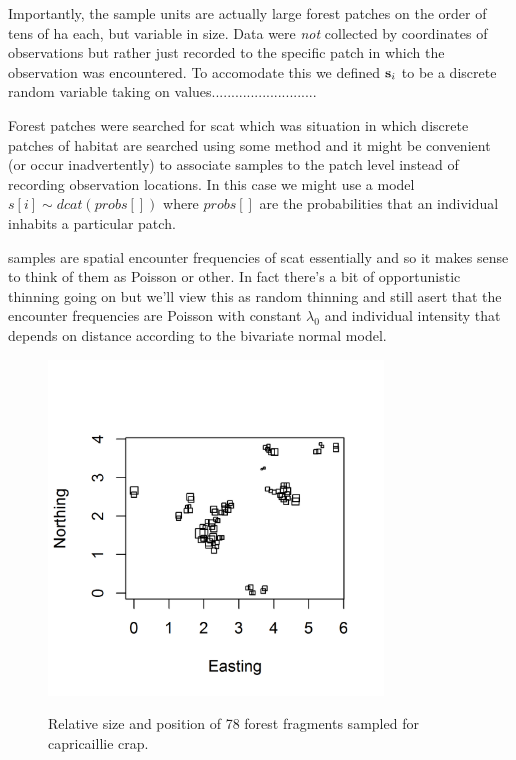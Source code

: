 {Importantly, the sample units are actually large forest
patches on the order of tens of ha each, but variable in size. Data
were {\it not} collected by coordinates of observations but rather
just recorded to the specific patch in which the observation was
encountered. To accomodate this we defined ${\bf s}_{i}$ to be a
discrete
random variable taking on values...........................

Forest patches were searched for scat which was
situation in which discrete patches of habitat are searched using some
method and it might be convenient (or occur inadvertently) to
associate samples to the patch level instead of recording observation
locations. In this case we might use a model $s[i] \sim dcat(probs[])$
where $probs[]$ are the probabilities that an individual inhabits a
particular patch.

samples are spatial encounter frequencies of scat essentially and so
it makes sense to think of them as Poisson or other.
In fact there's a bit of opportunistic thinning going on but we'll view
this as random thinning and still asert that the encounter frequencies
are Poisson with constant $\lambda_{0}$ and individual intensity that
depends on distance according to the bivariate normal model. 



\begin{figure}
\centering
\includegraphics[width=3.5in,height=3.5in]{Ch5/figs/Cap-fragments.png}
\label{poisson-mn.fig.capfrags}
\caption{Relative size and position of 78 forest fragments sampled for
  capricaillie crap.}
\end{figure}


}
